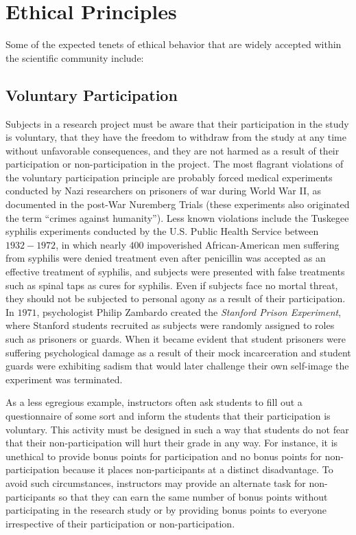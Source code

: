 \section{Ethical Principles}

Some of the expected tenets of ethical behavior that are widely accepted within the scientific community include:

\subsection{Voluntary Participation}

Subjects in a research project must be aware that their participation in the study is voluntary, that they have the freedom to withdraw from the study at any time without unfavorable consequences, and they are not harmed as a result of their participation or non-participation in the project. The most flagrant violations of the voluntary participation principle are probably forced medical experiments conducted by Nazi researchers on prisoners of war during World War II, as documented in the post-War Nuremberg Trials (these experiments also originated the term ``crimes against humanity''). Less known violations include the Tuskegee syphilis experiments\cite{reverby2009examining} conducted by the U.S. Public Health Service between $ 1932-1972 $, in which nearly $ 400 $ impoverished African-American men suffering from syphilis were denied treatment even after penicillin was accepted as an effective treatment of syphilis, and subjects were presented with false treatments such as spinal taps as cures for syphilis. Even if subjects face no mortal threat, they should not be subjected to personal agony as a result of their participation. In $ 1971 $, psychologist Philip Zambardo created the \textit{Stanford Prison Experiment}, where Stanford students recruited as subjects were randomly assigned to roles such as prisoners or guards. When it became evident that student prisoners were suffering psychological damage as a result of their mock incarceration and student guards were exhibiting sadism that would later challenge their own self-image the experiment was terminated.

As a less egregious example, instructors often ask students to fill out a questionnaire of some sort and inform the students that their participation is voluntary. This activity must be designed in such a way that students do not fear that their non-participation will hurt their grade in any way. For instance, it is unethical to provide bonus points for participation and no bonus points for non-participation because it places non-participants at a distinct disadvantage. To avoid such circumstances, instructors may provide an alternate task for non-participants so that they can earn the same number of bonus points without participating in the research study or by providing bonus points to everyone irrespective of their participation or non-participation. 

